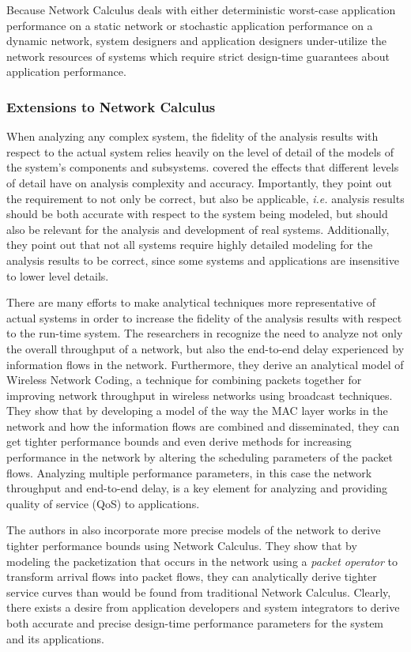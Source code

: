 Because Network Calculus deals with either deterministic worst-case application performance on a static network or stochastic application performance on a dynamic network, system designers and application designers under-utilize the network resources of systems which require strict design-time guarantees about application performance.  

\subsubsection{Extensions to Network Calculus}
When analyzing any complex system, the fidelity of the analysis results with respect to the actual system relies heavily on the level of detail of the models of the system's components and subsystems. \cite{Heidemann2001} covered the effects that different levels of detail have on analysis complexity and accuracy.  Importantly, they point out the requirement to not only be correct, but also be applicable, \emph{i.e.} analysis results should be both accurate with respect to the system being modeled, but should also be relevant for the analysis and development of real systems.  Additionally, they point out that not all systems require highly detailed modeling for the analysis results to be correct, since some systems and applications are insensitive to lower level details.

There are many efforts to make analytical techniques more representative of actual systems in order to increase the fidelity of the analysis results with respect to the run-time system.  The researchers in \cite{NCnetworkCoding} recognize the need to analyze not only the overall throughput of a network, but also the end-to-end delay experienced by information flows in the network.  Furthermore, they derive an analytical model of Wireless Network Coding\cite{networkcodingCOPE}, a technique for combining packets together for improving network throughput in wireless networks using broadcast techniques.  They show that by developing a model of the way the MAC layer works in the network and how the information flows are combined and disseminated, they can get tighter performance bounds and even derive methods for increasing performance in the network by altering the scheduling parameters of the packet flows.  Analyzing multiple performance parameters, in this case the network throughput and end-to-end delay, is a key element for analyzing and providing quality of service (QoS) to applications.

The authors in \cite{NCpacketcurve2012} also incorporate more precise models of the network to derive tighter performance bounds using Network Calculus.  They show that by modeling the packetization that occurs in the network using a \textit{packet operator} to transform arrival flows into packet flows, they can analytically derive tighter service curves than would be found from traditional Network Calculus.  Clearly, there exists a desire from application developers and system integrators to derive both accurate and precise design-time performance parameters for the system and its applications.  

